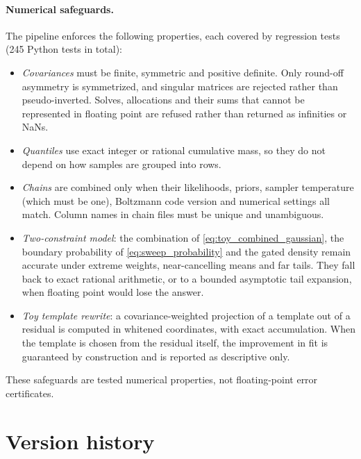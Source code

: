 \documentclass[11pt]{article}
\theoremstyle{remark}
\numberwithin{equation}{section}
\begin{document}
\paragraph{Numerical safeguards.}
The pipeline enforces the following properties, each covered by regression tests (245 Python tests in total):
\begin{itemize}[leftmargin=*, itemsep=1pt]
  \item \emph{Covariances} must be finite, symmetric and positive definite. Only round-off asymmetry is symmetrized, and singular matrices are rejected rather than pseudo-inverted. Solves, allocations and their sums that cannot be represented in floating point are refused rather than returned as infinities or NaNs.
  \item \emph{Quantiles} use exact integer or rational cumulative mass, so they do not depend on how samples are grouped into rows.
  \item \emph{Chains} are combined only when their likelihoods, priors, sampler temperature (which must be one), Boltzmann code version and numerical settings all match. Column names in chain files must be unique and unambiguous.
  \item \emph{Two-constraint model}: the combination of \cref{eq:toy_combined_gaussian}, the boundary probability of \cref{eq:sweep_probability} and the gated density remain accurate under extreme weights, near-cancelling means and far tails. They fall back to exact rational arithmetic, or to a bounded asymptotic tail expansion, when floating point would lose the answer.
  \item \emph{Toy template rewrite}: a covariance-weighted projection of a template out of a residual is computed in whitened coordinates, with exact accumulation. When the template is chosen from the residual itself, the improvement in fit is guaranteed by construction and is reported as descriptive only.
\end{itemize}
These safeguards are tested numerical properties, not floating-point error certificates.
 \section{Version history}
\label{app:versions}
\end{document}
